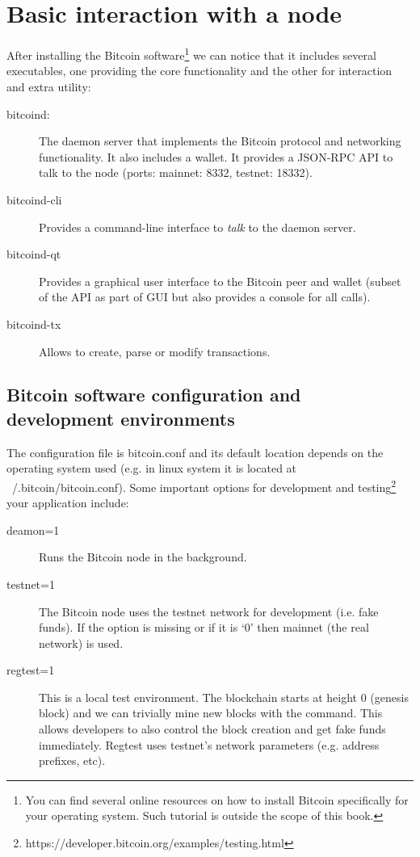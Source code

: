 \section{Basic interaction with a node}
After installing the Bitcoin software\footnote{You can find several online resources on how to install Bitcoin specifically for your operating system. Such tutorial is outside the scope of this book.} we can notice that it includes several executables, one providing the core functionality and the other for interaction and extra utility:
\begin{description}
	\item[bitcoind:] The daemon server that implements the Bitcoin protocol and networking functionality. It also includes a wallet. It provides a JSON-RPC API to talk to the node (ports: mainnet: 8332, testnet: 18332).
	\item[bitcoind-cli] Provides a command-line interface to \emph{talk} to the daemon server.
	\item[bitcoind-qt] Provides a graphical user interface to the Bitcoin peer and wallet (subset of the API as part of GUI but also provides a console for all calls).
	\item[bitcoind-tx] Allows to create, parse or modify transactions.
\end{description}

\subsection*{Bitcoin software configuration and development environments}
The configuration file is bitcoin.conf and its default location depends on the operating system used (e.g. in linux system it is located at ~/.bitcoin/bitcoin.conf). Some important options for development and testing\footnote{https://developer.bitcoin.org/examples/testing.html} your application include:

\begin{description}
	\item[deamon=1] Runs the Bitcoin node in the background.
	\item[testnet=1] The Bitcoin node uses the testnet network for development (i.e. fake funds). If the option is missing or if it is `0' then mainnet (the real network) is used.
	\item[regtest=1] This is a local test environment. The blockchain starts at height 0 (genesis block) and we can trivially mine new blocks with the  command. This allows developers to also control the block creation and get fake funds immediately. Regtest uses testnet’s network parameters (e.g. address prefixes, etc).
\end{description}


